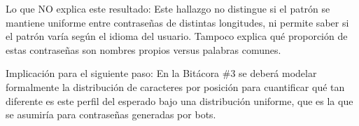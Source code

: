 \documentclass[12pt, letterpaper]{article}
\begin{document}
\noindent
Lo que NO explica este resultado: Este hallazgo no distingue si el patrón se mantiene uniforme entre contraseñas de distintas longitudes, ni permite saber si el patrón varía según el idioma del usuario. Tampoco explica qué proporción de estas contraseñas son nombres propios versus palabras comunes. \newline

\noindent
Implicación para el siguiente paso: En la Bitácora \#3 se deberá modelar formalmente la distribución de caracteres por posición para cuantificar qué tan diferente es este perfil del esperado bajo una distribución uniforme, que es la que se asumiría para contraseñas generadas por bots.
\end{document}
